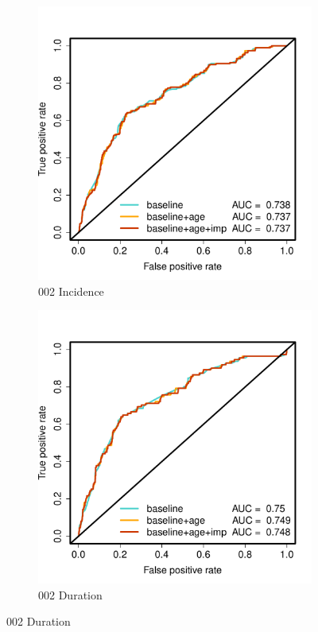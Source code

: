 \documentclass[12pt,twoside]{article}
\begin{document}
        
        
        
   \begin{figure}[h]
        \centering
        
        \begin{subfigure}{.475\textwidth}
            \includegraphics[width=\textwidth]{002Incidence_AUC_H3N2.pdf}
            \caption{002 Incidence}
        \end{subfigure}\hfill
                \begin{subfigure}{.475\textwidth}
            \includegraphics[width=\textwidth]{002Duration_AUC_H3N2.pdf}
            \caption{002 Duration}
        \end{subfigure}\hfill
    

\end{figure}
\end{document}
